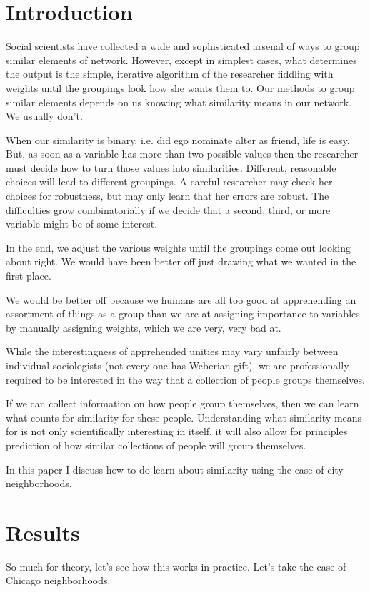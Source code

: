 \documentclass[12pt,letter]{article}\usepackage[]{graphicx}\usepackage[]{color}
\begin{document}
\section*{Introduction}
Social scientists have collected a wide and sophisticated arsenal of
ways to group similar elements of network. However, except in simplest
cases, what determines the output is the simple, iterative algorithm
of the researcher fiddling with weights until the groupings look how
she wants them to. Our methods to group similar elements depends on us
knowing what similarity means in our network. We usually don't.

When our similarity is binary, i.e. did ego nominate
alter as friend, life is easy. But, as soon as a variable has more
than two possible values then the researcher must decide how to turn
those values into similarities. Different, reasonable choices will
lead to different groupings. A careful researcher may check
her choices for robustness, but may only learn that her errors are
robust. The difficulties grow combinatorially if we decide that
a second, third, or more variable might be of some interest.

In the end, we adjust the various weights until the groupings come out
looking about right. We would have been better off just drawing what
we wanted in the first place.

We would be better off because we humans are all too good at
apprehending an assortment of things as a group than we are at
assigning importance to variables by manually assigning weights, which
we are very, very bad at.

While the interestingness of apprehended unities may vary 
unfairly between individual sociologists (not every one has Weberian gift),
we are professionally required to be interested in the way that a
collection of people groups themselves.

If we can collect information on how people group themselves, then we
can learn what counts for similarity for these people. Understanding
what similarity means for is not only scientifically interesting in
itself, it will also allow for principles prediction of how similar
collections of people will group themselves.

In this paper I discuss how to do learn about similarity using the
case of city neighborhoods. 



\section*{Results}
So much for theory, let's see how this works in practice. Let's take
the case of Chicago neighborhoods.  
\end{document}
